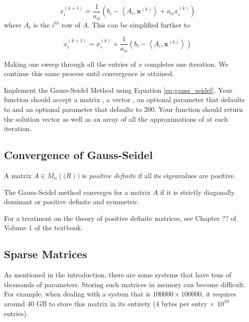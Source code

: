 $$
x^{(k+1)}_i = \frac{1}{a_{ii}} \left ( b_i - \left < A_i, \mathbf{x}^{(k)} \right > + a_{ii}x^{(k)}_i \right )
$$
where $A_i$ is the $i^{th}$ row of $A$. This can be simplified further to

\begin{equation} \label{eq:gauss_seidel}
x^{(k+1)}_i = x^{(k)}_i + \frac{1}{a_{ii}} \left ( b_i - \left < A_i, \mathbf{x}^{(k)}\right >\right)
\end{equation}

Making one sweep through all the entries of $x$ completes one iteration. We continue this same process until convergence is attained.

\begin{problem} \label{prob:gauss_seidel}
Implement the Gauss-Seidel Method using Equation \ref{eq:gauss_seidel}. Your function should accept a matrix , a vector , an optional parameter  that defaults to  and an optional parameter  that defaults to $200$. Your function should return the solution vector  as well as an array of all the approximations of  at each iteration.
\end{problem}

\subsection*{Convergence of Gauss-Seidel}
\begin{definition}
    A matrix $A \in M_n(\mathbb(R))$ is \emph{positive definite} if all its eigenvalues are positive.
\end{definition}

\begin{theorem}
    The Gauss-Seidel method converges for a matrix $A$ if it is strictly diagonally dominant or positive definite and symmetric.
\end{theorem}

For a treatment on the theory of positive definite matrices, see Chapter ?? of Volume 1 of the textbook.

\subsection*{Sparse Matrices}
As mentioned in the introduction, there are some systems that have tens of thousands of parameters. Storing such matrices in memory can become difficult. For example, when dealing with a system that is $100000 \times 100000$, it requires around 40 GB to store this matrix in its entirety (4 bytes per entry $\times$ $10^{10}$ entries).

